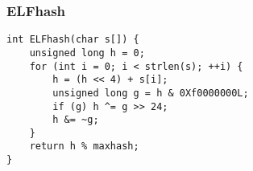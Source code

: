\subsubsection{ELFhash}
\begin{verbatim}
int ELFhash(char s[]) {
	unsigned long h = 0;
	for (int i = 0; i < strlen(s); ++i) {
		h = (h << 4) + s[i];
		unsigned long g = h & 0Xf0000000L;
		if (g) h ^= g >> 24;
		h &= ~g;
	}
	return h % maxhash;
}
\end{verbatim}
